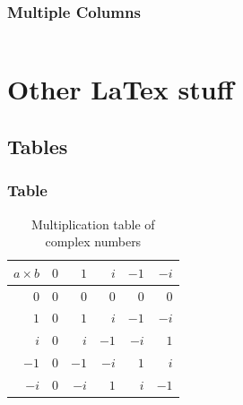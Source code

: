 \documentclass[aspectratio=169]{beamer}
\begin{document}
\begin{frame}
\frametitle{Multiple Columns}
\begin{columns}[c] 



\end{columns}
\end{frame}



\section{Other LaTex stuff}

\subsection{Tables}


\begin{frame}
\frametitle{Table}
\begin{table}[H] 
\begin{tabular}{r | r r r r r} 
$a \times b$ & $0$ &  $1$ &  $i$ & $-1$ & $-i$ \\ \hline
         $0$ & $0$ &  $0$ &  $0$ &  $0$ &  $0$ \\
         $1$ & $0$ &  $1$ &  $i$ & $-1$ & $-i$ \\
         $i$ & $0$ &  $i$ & $-1$ & $-i$ &  $1$ \\
        $-1$ & $0$ & $-1$ & $-i$ &  $1$ &  $i$ \\
        $-i$ & $0$ & $-i$ &  $1$ &  $i$ & $-1$ \\
\end{tabular}
\caption{Multiplication table of complex numbers}
\end{table}
\end{frame}
\end{document}
